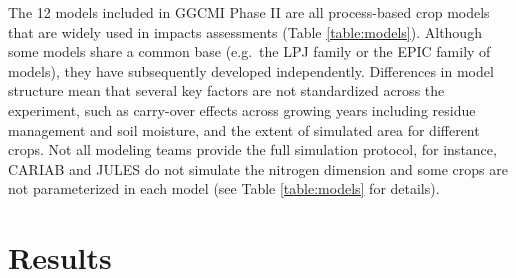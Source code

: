 \documentclass[gmd, manuscript]{copernicus} %
\begin{document}
The 12 models included in GGCMI Phase II are all process-based crop models that are widely used in impacts assessments (Table \ref{table:models}). 
Although some models share a common base (e.g.\ the LPJ family or the EPIC family of models), they have subsequently developed independently. 
Differences in model structure mean that several key factors are not standardized across the experiment, such as carry-over effects across growing years including residue management and soil moisture, and the extent of simulated area for different crops. 
Not all modeling teams provide the full simulation protocol, for instance, CARIAB and JULES do not simulate the nitrogen dimension and some crops are not parameterized in each model (see Table \ref{table:models} for details). 

\section{Results}
\label{S:4}
\end{document}
